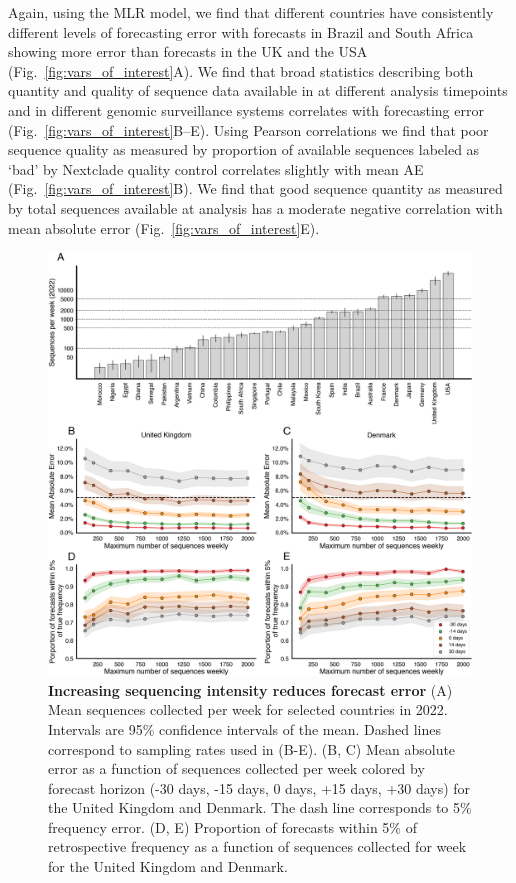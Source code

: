 \documentclass[11pt,oneside,letterpaper]{article}
\begin{document}
Again, using the MLR model, we find that different countries have consistently different levels of forecasting error with forecasts in Brazil and South Africa showing more error than forecasts in the UK and the USA  (Fig.~\ref{fig:vars_of_interest}A).
We find that broad statistics describing both quantity and quality of sequence data available in at different analysis timepoints and in different genomic surveillance systems correlates with forecasting error (Fig.~\ref{fig:vars_of_interest}B--E).
Using Pearson correlations we find that poor sequence quality as measured by proportion of available sequences labeled as `bad' by Nextclade quality control \cite{aksamentov2021nextclade} correlates slightly with mean AE (Fig.~\ref{fig:vars_of_interest}B).
We find that good sequence quantity as measured by total sequences available at analysis has a moderate negative correlation with mean absolute error (Fig.~\ref{fig:vars_of_interest}E).

\begin{figure}[tb!]
    \centering
    \includegraphics[width=1.0\linewidth]{figures/downscaling_sequencing.png}
    \caption{
			\textbf{Increasing sequencing intensity reduces forecast error}
    	(A) Mean sequences collected per week for selected countries in 2022.
			Intervals are 95\% confidence intervals of the mean.
			Dashed lines correspond to sampling rates used in (B-E).
    	(B, C) Mean absolute error as a function of sequences collected per week colored by forecast horizon (-30 days, -15 days, 0 days, +15 days, +30 days) for the United Kingdom and Denmark.
			The dash line corresponds to 5\% frequency error.
    	(D, E) Proportion of forecasts within 5\% of retrospective frequency as a function of sequences collected for week for the United Kingdom and Denmark.
  	}
    \label{fig:downscaling}
\end{figure}
\end{document}
